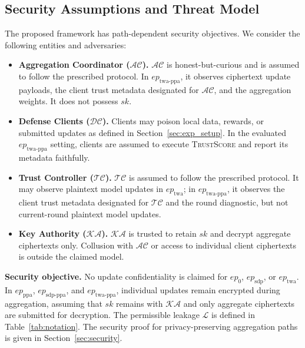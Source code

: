 \documentclass[journal]{IEEEtran}
\begin{document}
\subsection{Security Assumptions and Threat Model}

The proposed framework has path-dependent security objectives. We consider the
following entities and adversaries:

\begin{itemize}

  \item \textbf{Aggregation Coordinator ($\mathcal{AC}$).}
  $\mathcal{AC}$ is honest-but-curious and is assumed to follow the prescribed protocol. 
  In $ep_{\mathrm{twa\text{-}ppa}}$, it observes ciphertext update payloads, 
  the client trust metadata designated for $\mathcal{AC}$, and the 
  aggregation weights. It does not possess $sk$.

  \item \textbf{Defense Clients ($\mathcal{DC}$).}
  Clients may poison local data, rewards, or submitted updates as defined in
  Section~\ref{sec:exp_setup}. In the evaluated
  $ep_{\mathrm{twa\text{-}ppa}}$ setting, clients are assumed to execute
  \textsc{TrustScore} and report its metadata faithfully.

  \item \textbf{Trust Controller ($\mathcal{TC}$).}
  $\mathcal{TC}$ is assumed to follow the prescribed protocol.
  It may observe plaintext model updates in $ep_{\mathrm{twa}}$; in
  $ep_{\mathrm{twa\text{-}ppa}}$, it observes the client trust metadata
  designated for $\mathcal{TC}$ and the round diagnostic,
  but not current-round plaintext model updates.

  \item \textbf{Key Authority ($\mathcal{KA}$).}
  $\mathcal{KA}$ is trusted to retain $sk$ and decrypt aggregate ciphertexts
  only. Collusion with $\mathcal{AC}$ or access to individual client
  ciphertexts is outside the claimed model.

\end{itemize}

\noindent\textbf{Security objective.}
No update confidentiality is claimed for $ep_{0}$,
$ep_{\mathrm{sdp}}$, or $ep_{\mathrm{twa}}$. In
$ep_{\mathrm{ppa}}$, $ep_{\mathrm{sdp\text{-}ppa}}$, and
$ep_{\mathrm{twa\text{-}ppa}}$, individual updates remain encrypted during
aggregation, assuming that $sk$ remains with $\mathcal{KA}$ and only aggregate
ciphertexts are submitted for decryption. The permissible leakage
$\mathcal{L}$ is defined in Table~\ref{tab:notation}. 
The security proof for privacy-preserving aggregation paths is
given in Section~\ref{sec:security}.
\end{document}
